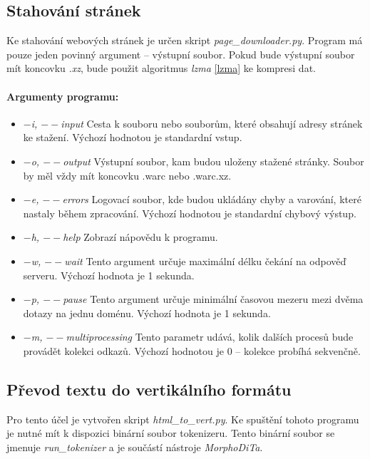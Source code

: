 \subsection{Stahování stránek}
Ke stahování webových stránek je určen skript \textit{page\_downloader.py}. Program má
pouze jeden povinný argument -- výstupní soubor. Pokud bude výstupní soubor mít koncovku
\textit{.xz}, bude použit algoritmus \textit{lzma} \ref{lzma} ke kompresi dat.

\paragraph{Argumenty programu: }
\begin{itemize}
    \item \textit{$-$i, $--$input} Cesta k souboru nebo souborům, které obsahují adresy stránek ke stažení. Výchozí hodnotou je standardní vstup.
    \item \textit{$-$o, $--$output} Výstupní soubor, kam budou uloženy stažené stránky. Soubor by měl vždy mít koncovku .warc nebo .warc.xz.
    \item \textit{$-$e, $--$errors} Logovací soubor, kde budou ukládány chyby a varování, které nastaly během zpracování. Výchozí hodnotou je standardní chybový výstup.
    \item \textit{$-$h, $--$help} Zobrazí nápovědu k programu.
    \item \textit{$-$w, $--$wait} Tento argument určuje maximální délku čekání na odpověď serveru. Výchozí hodnota je 1 sekunda.
    \item \textit{$-$p, $--$pause} Tento argument určuje minimální časovou mezeru mezi dvěma dotazy na jednu doménu. Výchozí hodnota je 1 sekunda.
    \item \textit{$-$m, $--$multiprocessing} Tento parametr udává, kolik dalších procesů bude provádět kolekci odkazů. Výchozí hodnotou je 0 -- kolekce probíhá sekvenčně.
\end{itemize}

\subsection{Převod textu do vertikálního formátu}
Pro tento účel je vytvořen skript \textit{html\_to\_vert.py}. Ke spuštění tohoto programu je nutné mít
k dispozici binární soubor tokenizeru. Tento binární soubor se jmenuje \textit{run\_tokenizer} a je
součástí nástroje \textit{MorphoDiTa}.

